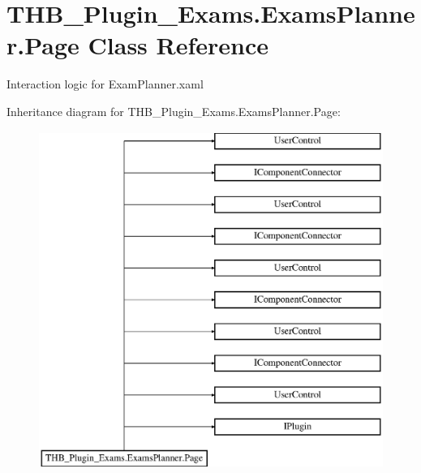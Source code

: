 \hypertarget{class_t_h_b___plugin___exams_1_1_exams_planner_1_1_page}{}\section{T\+H\+B\+\_\+\+Plugin\+\_\+\+Exams.\+Exams\+Planner.\+Page Class Reference}
\label{class_t_h_b___plugin___exams_1_1_exams_planner_1_1_page}


Interaction logic for Exam\+Planner.\+xaml  


Inheritance diagram for T\+H\+B\+\_\+\+Plugin\+\_\+\+Exams.\+Exams\+Planner.\+Page\+:\begin{figure}[H]
\begin{center}
\leavevmode
\includegraphics[height=11.000000cm]{d0/d19/class_t_h_b___plugin___exams_1_1_exams_planner_1_1_page}
\end{center}
\end{figure}
